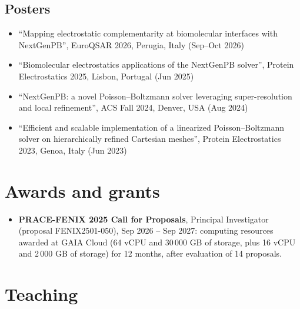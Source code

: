 \documentclass[11pt]{article}
\begin{document}
\subsection{Posters}
\begin{itemize}
  \item “Mapping electrostatic complementarity at biomolecular interfaces with NextGenPB”, EuroQSAR 2026, Perugia, Italy (Sep–Oct 2026)
  \item “Biomolecular electrostatics applications of the NextGenPB solver”, Protein Electrostatics 2025, Lisbon, Portugal (Jun 2025)
  \item “NextGenPB: a novel Poisson–Boltzmann solver leveraging super-resolution and local refinement”, ACS Fall 2024, Denver, USA (Aug 2024)
  \item “Efficient and scalable implementation of a linearized Poisson–Boltzmann solver on hierarchically refined Cartesian meshes”, Protein Electrostatics 2023, Genoa, Italy (Jun 2023)
\end{itemize}

\section{Awards and grants}
\begin{itemize}
  \item \textbf{PRACE-FENIX 2025 Call for Proposals}, Principal Investigator (proposal FENIX2501-050), Sep 2026 – Sep 2027: computing resources awarded at GAIA Cloud (64 vCPU and 30\,000 GB of storage, plus 16 vCPU and 2\,000 GB of storage) for 12 months, after evaluation of 14 proposals.
\end{itemize}

\section{Teaching}
\end{document}
